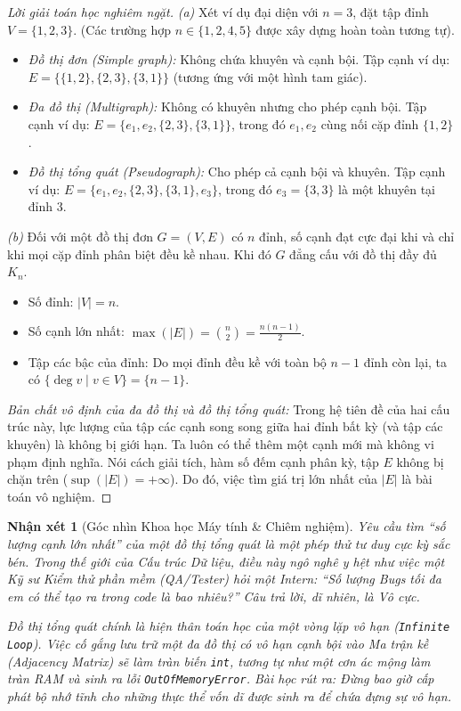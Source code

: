 \documentclass{article}
\newtheorem{nhanxet}{Nhận xét}
\begin{document}
\begin{proof}[Lời giải toán học nghiêm ngặt]
	\emph{(a)} Xét ví dụ đại diện với $n = 3$, đặt tập đỉnh $V = \{1, 2, 3\}$. (Các trường hợp $n \in \{1, 2, 4, 5\}$ được xây dựng hoàn toàn tương tự).
	\begin{itemize}
		\item \emph{Đồ thị đơn (Simple graph):} Không chứa khuyên và cạnh bội. Tập cạnh ví dụ: $E = \{\{1,2\}, \{2,3\}, \{3,1\}\}$ (tương ứng với một hình tam giác).
		\item \emph{Đa đồ thị (Multigraph):} Không có khuyên nhưng cho phép cạnh bội. Tập cạnh ví dụ: $E = \{e_1, e_2, \{2,3\}, \{3,1\}\}$, trong đó $e_1, e_2$ cùng nối cặp đỉnh $\{1,2\}$.
		\item \emph{Đồ thị tổng quát (Pseudograph):} Cho phép cả cạnh bội và khuyên. Tập cạnh ví dụ: $E = \{e_1, e_2, \{2,3\}, \{3,1\}, e_3\}$, trong đó $e_3 = \{3,3\}$ là một khuyên tại đỉnh $3$.
	\end{itemize}
	\emph{(b)} Đối với một đồ thị đơn $G = (V,E)$ có $n$ đỉnh, số cạnh đạt cực đại khi và chỉ khi mọi cặp đỉnh phân biệt đều kề nhau. Khi đó $G$ đẳng cấu với đồ thị đầy đủ $K_n$.
	\begin{itemize}
		\item Số đỉnh: $|V| = n$.
		\item Số cạnh lớn nhất: $\max(|E|) = \binom{n}{2} = \frac{n(n-1)}{2}$.
		\item Tập các bậc của đỉnh: Do mọi đỉnh đều kề với toàn bộ $n-1$ đỉnh còn lại, ta có $\{\deg v \mid v \in V\} = \{n-1\}$.
	\end{itemize}
	\textit{Bản chất vô định của đa đồ thị và đồ thị tổng quát:} Trong hệ tiên đề của hai cấu trúc này, lực lượng của tập các cạnh song song giữa hai đỉnh bất kỳ (và tập các khuyên) là không bị giới hạn. Ta luôn có thể thêm một cạnh mới mà không vi phạm định nghĩa. Nói cách giải tích, hàm số đếm cạnh phân kỳ, tập $E$ không bị chặn trên ($\sup(|E|) = +\infty$). Do đó, việc tìm giá trị lớn nhất của $|E|$ là bài toán vô nghiệm.
\end{proof}

\begin{nhanxet}[Góc nhìn Khoa học Máy tính \& Chiêm nghiệm]
	Yêu cầu tìm ``số lượng cạnh lớn nhất'' của một đồ thị tổng quát là một phép thử tư duy cực kỳ sắc bén. Trong thế giới của Cấu trúc Dữ liệu, điều này ngô nghê y hệt như việc một Kỹ sư Kiểm thử phần mềm (\textsf{QA/Tester}) hỏi một \textsf{Intern}: \textit{``Số lượng Bugs tối đa em có thể tạo ra trong code là bao nhiêu?''} Câu trả lời, dĩ nhiên, là Vô cực. 
	
	Đồ thị tổng quát chính là hiện thân toán học của một vòng lặp vô hạn (\texttt{Infinite Loop}). Việc cố gắng lưu trữ một đa đồ thị có vô hạn cạnh bội vào Ma trận kề (\textit{Adjacency Matrix}) sẽ làm tràn biến \texttt{int}, tương tự như một cơn ác mộng làm tràn RAM và sinh ra lỗi \texttt{OutOfMemoryError}. Bài học rút ra: Đừng bao giờ cấp phát bộ nhớ tĩnh cho những thực thể vốn dĩ được sinh ra để chứa đựng sự vô hạn.
\end{nhanxet}
\end{document}
